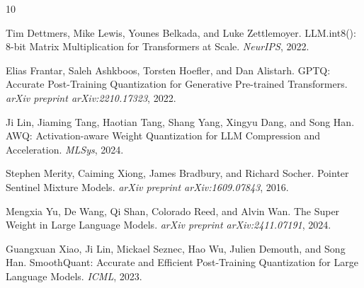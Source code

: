 \documentclass{article}
\begin{document}

\begin{thebibliography}{10}

Tim Dettmers, Mike Lewis, Younes Belkada, and Luke Zettlemoyer.
\newblock LLM.int8(): 8-bit Matrix Multiplication for Transformers at Scale.
\newblock \emph{NeurIPS}, 2022.

Elias Frantar, Saleh Ashkboos, Torsten Hoefler, and Dan Alistarh.
\newblock GPTQ: Accurate Post-Training Quantization for Generative Pre-trained Transformers.
\newblock \emph{arXiv preprint arXiv:2210.17323}, 2022.

Ji Lin, Jiaming Tang, Haotian Tang, Shang Yang, Xingyu Dang, and Song Han.
\newblock AWQ: Activation-aware Weight Quantization for LLM Compression and Acceleration.
\newblock \emph{MLSys}, 2024.

Stephen Merity, Caiming Xiong, James Bradbury, and Richard Socher.
\newblock Pointer Sentinel Mixture Models.
\newblock \emph{arXiv preprint arXiv:1609.07843}, 2016.

Mengxia Yu, De Wang, Qi Shan, Colorado Reed, and Alvin Wan.
\newblock The Super Weight in Large Language Models.
\newblock \emph{arXiv preprint arXiv:2411.07191}, 2024.

Guangxuan Xiao, Ji Lin, Mickael Seznec, Hao Wu, Julien Demouth, and Song Han.
\newblock SmoothQuant: Accurate and Efficient Post-Training Quantization for Large Language Models.
\newblock \emph{ICML}, 2023.

\end{thebibliography}
\end{document}
